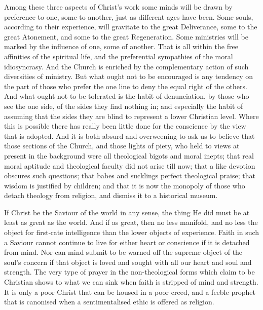 \documentclass[12pt,a5paper,twoside,titlepage]{book}
\begin{document}
Among these three aspects of Christ's work 
some minds will be drawn by preference to 
one, some to another, just as different ages 
have been. Some souls, according to their experience, 
will gravitate to the great Deliverance, 
some to the great Atonement, and some to the 
great Regeneration. Some ministries will be 
marked by the influence of one, some of 
another. That is all within the free affinities 
of the spiritual life, and the preferential sympathies 
of the moral idiosyncrasy. And the 
Church is enriched by the complementary 
action of such diversities of ministry. But 
what ought not to be encouraged is any tendency 
on the part of those who prefer the 
one line to deny the equal right of the others. 
And what ought not to be tolerated is the 
habit of denunciation, by those who see the 
one side, of the sides they find nothing in; and 
especially the habit of assuming that the sides 
they are blind to represent a lower Christian 
level. Where this is possible there has really 
been little done for the conscience by the view 
that is adopted. And it is both absurd and overweening 
to ask us to believe that those sections 
of the Church, and those lights of piety, who 
held to views at present in the background were 
all theological bigots and moral inepts; that 
real moral aptitude and theological faculty did 
not arise till now; that a like devotion obscures 
such questions; that babes and sucklings perfect 
theological praise; that wisdom is justified 
by children; and that it is now the monopoly 
of those who detach theology from religion, and 
dismiss it to a historical museum. 

If Christ be the Saviour of the world in 
any sense, the thing He did must be at least as 
great as the world. And if as great, then no 
less manifold, and no less the object for first-rate 
intelligence than the lower objects of 
experience. Faith in such a Saviour cannot 
continue to live for either heart or conscience 
if it is detached from mind. Nor can mind 
submit to be warned off the supreme object of 
the soul's concern if that object is loved and 
sought with all our heart and soul and 
strength. The very type of prayer in the 
non-theological forms which claim to be Christian 
shows to what we can sink when faith is 
stripped of mind and strength. It is only a poor 
Christ that can be housed in a poor creed, and 
a feeble prophet that is canonised when a 
sentimentalised ethic is offered as religion. 
\end{document}
